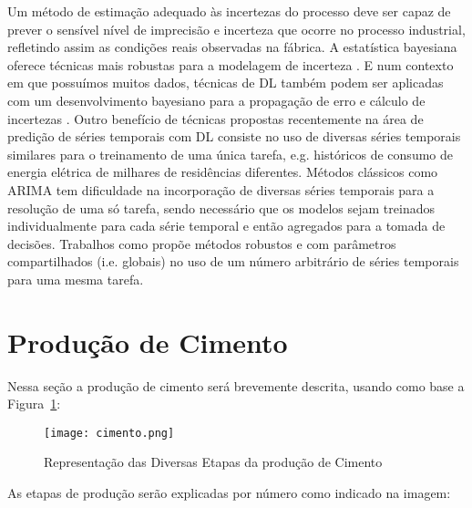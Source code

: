 Um método de estimação adequado às incertezas do processo deve ser capaz de prever o sensível nível de imprecisão e
incerteza que ocorre no processo industrial,
refletindo assim as condições reais observadas na fábrica. A estatística bayesiana oferece técnicas
mais robustas para a modelagem de incerteza \citep{bayesml}. E num contexto em
que possuímos muitos dados, técnicas de DL também podem ser aplicadas com um
desenvolvimento bayesiano para a propagação de erro e cálculo de incertezas
\citep{ubertime,Gal2016Uncertainty}. Outro benefício de técnicas propostas
recentemente na área de predição de séries temporais com DL consiste no uso de diversas séries temporais similares para o treinamento de uma
única tarefa, e.g. históricos de consumo de energia elétrica de milhares
de residências diferentes. Métodos clássicos como ARIMA tem 
dificuldade na incorporação de diversas séries temporais para a resolução de uma
só tarefa, sendo necessário que os modelos sejam treinados individualmente para
cada série temporal e então agregados para a tomada de decisões. Trabalhos como
\citep{ubertime,deepar,deepfactors} propõe métodos robustos e com parâmetros
compartilhados (i.e. globais) no uso de um número arbitrário de séries temporais
para uma mesma tarefa.



\section{Produção de Cimento}
\label{sec:producao}

Nessa seção a produção de cimento será brevemente descrita, usando como base a Figura~\ref{fig:cimento}:  

\begin{figure}[H]
\centering
\texttt{[image: cimento.png]}
\caption{Representação das Diversas Etapas da produção de Cimento \citep{cementroadmap}}
\label{fig:cimento}
\end{figure}


As etapas de produção serão explicadas por número como indicado na imagem: \\

